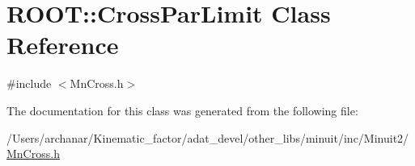 \hypertarget{classROOT_1_1Minuit2_1_1MnCross_1_1CrossParLimit}{}\section{R\+O\+OT\+:\+:Cross\+Par\+Limit Class Reference}
\label{classROOT_1_1Minuit2_1_1MnCross_1_1CrossParLimit}


{\ttfamily \#include $<$Mn\+Cross.\+h$>$}



The documentation for this class was generated from the following file\+:\begin{DoxyCompactItemize}
\item 
/\+Users/archanar/\+Kinematic\+\_\+factor/adat\+\_\+devel/other\+\_\+libs/minuit/inc/\+Minuit2/\mbox{\hyperlink{other__libs_2minuit_2inc_2Minuit2_2MnCross_8h}{Mn\+Cross.\+h}}\end{DoxyCompactItemize}
